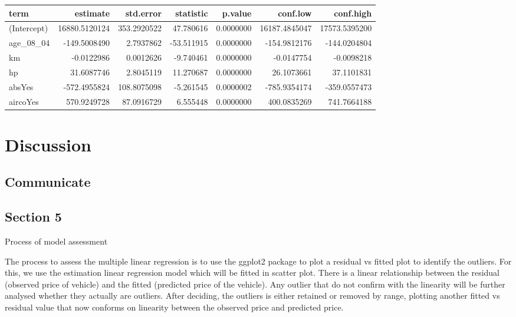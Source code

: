 \documentclass[
]{article}
\begin{document}
\begin{table}
\centering
\begin{tabular}{l|r|r|r|r|r|r}
\hline
term & estimate & std.error & statistic & p.value & conf.low & conf.high\\
\hline
(Intercept) & 16880.5120124 & 353.2920522 & 47.780616 & 0.0000000 & 16187.4845047 & 17573.5395200\\
\hline
age\_08\_04 & -149.5008490 & 2.7937862 & -53.511915 & 0.0000000 & -154.9812176 & -144.0204804\\
\hline
km & -0.0122986 & 0.0012626 & -9.740461 & 0.0000000 & -0.0147754 & -0.0098218\\
\hline
hp & 31.6087746 & 2.8045119 & 11.270687 & 0.0000000 & 26.1073661 & 37.1101831\\
\hline
absYes & -572.4955824 & 108.8075098 & -5.261545 & 0.0000002 & -785.9354174 & -359.0557473\\
\hline
aircoYes & 570.9249728 & 87.0916729 & 6.555448 & 0.0000000 & 400.0835269 & 741.7664188\\
\hline
\end{tabular}
\end{table}

\hypertarget{discussion}{%
\section{Discussion}\label{discussion}}

\hypertarget{communicate}{%
\subsection{Communicate}\label{communicate}}

\hypertarget{section-5}{%
\subsection{Section 5}\label{section-5}}

Process of model assessment

The process to assess the multiple linear regression is to use the
ggplot2 package to plot a residual vs fitted plot to identify the
outliers. For this, we use the estimation linear regression model which
will be fitted in scatter plot. There is a linear relationship between
the residual (observed price of vehicle) and the fitted (predicted price
of the vehicle). Any outlier that do not confirm with the linearity will
be further analysed whether they actually are outliers. After deciding,
the outliers is either retained or removed by range, plotting another
fitted vs residual value that now conforms on linearity between the
observed price and predicted price.
\end{document}
